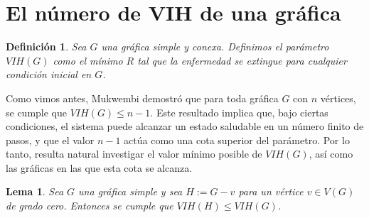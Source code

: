 \documentclass[12pt,titlepage,twoside,openright]{book}
\newtheorem{lemma}{Lema}[section]
\newtheorem{definition}{Definici\'on}[section]
\begin{document}
\section{El n\'umero de VIH de una gr\'afica}
\begin{definition}\label{Def:VIH(G)}
    Sea $G$ una gr\'afica simple y conexa. Definimos el par\'ametro $VIH(G)$ como el m\'inimo $R$ tal que la enfermedad se extingue para cualquier condici\'on inicial en $G$. 
\end{definition}
Como vimos antes, Mukwembi demostr\'o que para toda gr\'afica $G$ con $n$ v\'ertices, se cumple que $VIH(G) \leq n - 1$. Este resultado implica que, bajo ciertas condiciones, el sistema puede alcanzar un estado saludable en un n\'umero finito de pasos, y que el valor $n-1$ act\'ua como una cota superior del par\'ametro. Por lo tanto, resulta natural investigar el valor m\'inimo posible de $VIH(G)$, as\'i como las gr\'aficas en las que esta cota se alcanza.
\begin{lemma}\label{Lem:BorrarVertices}
    Sea $G$ una gr\'afica simple y sea $H := G - v$ para un v\'ertice $v \in V(G)$ de grado cero. Entonces se cumple que $VIH(H) \leq VIH(G)$.
\end{lemma}
\end{document}
